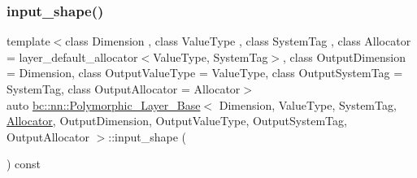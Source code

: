 \mbox{\label{structbc_1_1nn_1_1Polymorphic__Layer__Base_ad62346d67a5ad6fbf84999e9254455b8}} 
\subsubsection{\texorpdfstring{input\+\_\+shape()}{input\_shape()}\hspace{0.1cm}{\footnotesize\ttfamily [1/2]}}
{\footnotesize\ttfamily template$<$class Dimension , class Value\+Type , class System\+Tag , class Allocator  = layer\+\_\+default\+\_\+allocator$<$\+Value\+Type, System\+Tag$>$, class Output\+Dimension  = Dimension, class Output\+Value\+Type  = Value\+Type, class Output\+System\+Tag  = System\+Tag, class Output\+Allocator  = Allocator$>$ \\
auto \hyperlink{structbc_1_1nn_1_1Polymorphic__Layer__Base}{bc\+::nn\+::\+Polymorphic\+\_\+\+Layer\+\_\+\+Base}$<$ Dimension, Value\+Type, System\+Tag, \hyperlink{classbc_1_1allocators_1_1Allocator}{Allocator}, Output\+Dimension, Output\+Value\+Type, Output\+System\+Tag, Output\+Allocator $>$\+::input\+\_\+shape (\begin{DoxyParamCaption}{ }\end{DoxyParamCaption}) const\hspace{0.3cm}{\ttfamily [inline]}}

\mbox{\label{structbc_1_1nn_1_1Polymorphic__Layer__Base_ad62346d67a5ad6fbf84999e9254455b8}} 
